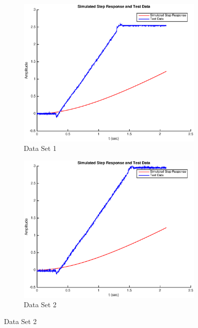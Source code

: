 \documentclass[11pt,a4paper]{article}
\begin{document}
\begin{enumerate}
   \begin{figure}[H]	
	  \begin{subfigure}{0.5\textwidth}
	  \includegraphics[width=0.9\linewidth]{Matlab_Code/Figures/B2_dataset1.eps} 
	  \caption{Data Set 1}
	  \label{fig:subim1}
	  \end{subfigure}
	  \begin{subfigure}{0.5\textwidth}
	  \includegraphics[width=0.9\linewidth]{Matlab_Code/Figures/B2_dataset2.eps}
	  \caption{Data Set 2}
	  \label{fig:subim2}
	  \end{subfigure}
	  

\end{figure}
\end{enumerate}
\end{document}
